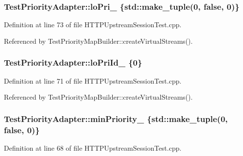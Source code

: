 \subsubsection[{lo\+Pri\+\_\+}]{ Test\+Priority\+Adapter\+::lo\+Pri\+\_\+ \{std\+::make\+\_\+tuple(0, false, 0)\}}\label{classTestPriorityAdapter_af3ebb3a61b484a192ee4e1d6944d3f64}


Definition at line 73 of file H\+T\+T\+P\+Upstream\+Session\+Test.\+cpp.



Referenced by Test\+Priority\+Map\+Builder\+::create\+Virtual\+Streams().

\subsubsection[{lo\+Pri\+Id\+\_\+}]{ Test\+Priority\+Adapter\+::lo\+Pri\+Id\+\_\+ \{0\}}\label{classTestPriorityAdapter_aa0493cac324039988f565a597b61daff}


Definition at line 71 of file H\+T\+T\+P\+Upstream\+Session\+Test.\+cpp.



Referenced by Test\+Priority\+Map\+Builder\+::create\+Virtual\+Streams().

\subsubsection[{min\+Priority\+\_\+}]{ Test\+Priority\+Adapter\+::min\+Priority\+\_\+ \{std\+::make\+\_\+tuple(0, false, 0)\}}\label{classTestPriorityAdapter_a8e435479993a563a5dc794b0038f49a7}


Definition at line 68 of file H\+T\+T\+P\+Upstream\+Session\+Test.\+cpp.



